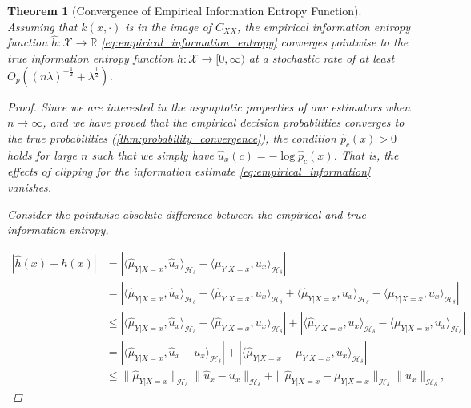 \documentclass{article}
\newtheorem{theorem}{Theorem}[section]
\begin{document}
		\begin{theorem}[Convergence of Empirical Information Entropy Function]
			\label{thm:entropy_convergence}
			Assuming that $k(x, \cdot)$ is in the image of $C_{XX}$, the empirical information entropy function $\hat{h} : \mathcal{X} \to \mathbb{R}$ \eqref{eq:empirical_information_entropy} converges pointwise to the true information entropy function $h : \mathcal{X} \to [0, \infty)$ at a stochastic rate of at least $O_{p}((n \lambda)^{-\frac{1}{2}} + \lambda^{\frac{1}{2}})$.
			
			\begin{proof}
				Since we are interested in the asymptotic properties of our estimators when $n \to \infty$, and we have proved that the empirical decision probabilities converges to the true probabilities (\cref{thm:probability_convergence}), the condition $\hat{p}_{c}(x) > 0$ holds for large $n$ such that we simply have $\hat{u}_{x}(c) = - \log{\hat{p}_{c}(x)}$. That is, the effects of clipping for the information estimate \eqref{eq:empirical_information} vanishes.
				
				Consider the pointwise absolute difference between the empirical and true information entropy,
				
				\begin{equation}
				\begin{aligned}
					| \hat{h}(x) - h(x) | &= | \langle \hat{\mu}_{Y | X = x}, \hat{u}_{x} \rangle_{\mathcal{H}_{\delta}} - \langle \mu_{Y | X = x}, u_{x} \rangle_{\mathcal{H}_{\delta}} | \\
					&= | \langle \hat{\mu}_{Y | X = x}, \hat{u}_{x} \rangle_{\mathcal{H}_{\delta}} - \langle \hat{\mu}_{Y | X = x}, u_{x} \rangle_{\mathcal{H}_{\delta}} + \langle \hat{\mu}_{Y | X = x}, u_{x} \rangle_{\mathcal{H}_{\delta}} - \langle \mu_{Y | X = x}, u_{x} \rangle_{\mathcal{H}_{\delta}} | \\
					&\leq | \langle \hat{\mu}_{Y | X = x}, \hat{u}_{x} \rangle_{\mathcal{H}_{\delta}} - \langle \hat{\mu}_{Y | X = x}, u_{x} \rangle_{\mathcal{H}_{\delta}} | + | \langle \hat{\mu}_{Y | X = x}, u_{x} \rangle_{\mathcal{H}_{\delta}} - \langle \mu_{Y | X = x}, u_{x} \rangle_{\mathcal{H}_{\delta}} | \\
					&= | \langle \hat{\mu}_{Y | X = x}, \hat{u}_{x} - u_{x} \rangle_{\mathcal{H}_{\delta}} | + | \langle \hat{\mu}_{Y | X = x} - \mu_{Y | X = x}, u_{x} \rangle_{\mathcal{H}_{\delta}} | \\
					&\leq \| \hat{\mu}_{Y | X = x} \|_{\mathcal{H}_{\delta}} \| \hat{u}_{x} - u_{x} \|_{\mathcal{H}_{\delta}} + \| \hat{\mu}_{Y | X = x} - \mu_{Y | X = x} \|_{\mathcal{H}_{\delta}} \| u_{x} \|_{\mathcal{H}_{\delta}},
				\label{eq:information_entropy_bound}
				\end{aligned}
				\end{equation}
				

\end{proof}
\end{theorem}
\end{document}
